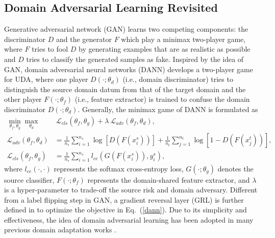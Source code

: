 \documentclass[runningheads]{llncs}
\begin{document}
\subsection{Domain Adversarial Learning Revisited}
Generative adversarial network (GAN) \cite{goodfellow2014generative} learns two competing components: the discriminator $D$ and the generator $F$ which play a minimax two-player game, where $F$ tries to fool $D$ by generating examples that are as realistic as possible and $D$ tries to classify the generated samples as fake.
Inspired by the idea of GAN, domain adversarial neural networks (DANN) \cite{ganin2015unsupervised,ganin2016domain} develops a two-player game for UDA, where one player $D(\cdot;\theta_d)$ (i.e., domain discriminator) tries to distinguish the source domain datum from that of the target domain and the other player $F(\cdot;\theta_f)$ (i.e., feature extractor) is trained to confuse the domain discriminator $D(\cdot;\theta_d)$.
Generally, the minimax game of DANN is formulated as
\begin{equation}
\begin{aligned}
\min\limits_{\theta_f, \theta_g} \max\limits_{\theta_d} &\ \mathcal{L}_{cls}(\theta_f, \theta_g) + \lambda \ \mathcal{L}_{adv}(\theta_f, \theta_d),\\
\mathcal{L}_{adv}(\theta_f, \theta_d) &= \frac{1}{n_s}\sum\nolimits_{i=1}^{n_s} \log[D(F(x_i^s))]+ \frac{1}{n_t} \sum\nolimits_{j=1}^{n_t} \log[1 - D(F(x_j^t))], \\
\mathcal{L}_{cls}(\theta_f, \theta_g) &= \frac{1}{n_s} \sum\nolimits_{i=1}^{n_s} {l}_{ce}(G(F(x_i^s)), y_i^s),
\end{aligned}
\label{dann}
\end{equation}
where ${l}_{ce}(\cdot, \cdot)$ represents the softmax cross-entropy loss, $G(\cdot; \theta_g)$ denotes the source classifier, $F(\cdot;\theta_f)$ represents the domain-shared feature extractor, and $\lambda$ is a hyper-parameter to trade-off the source risk and domain adversary.
Different from a label flipping step in GAN, a gradient reversal layer (GRL) is further defined in \cite{ganin2015unsupervised} to optimize the objective in Eq.~(\ref{dann}). 
Due to its simplicity and effectiveness, the idea of domain adversarial learning has been adopted in many previous domain adaptation works \cite{liu2016coupled,tzeng2017adversarial,long2018conditional}.
	
\end{document}
